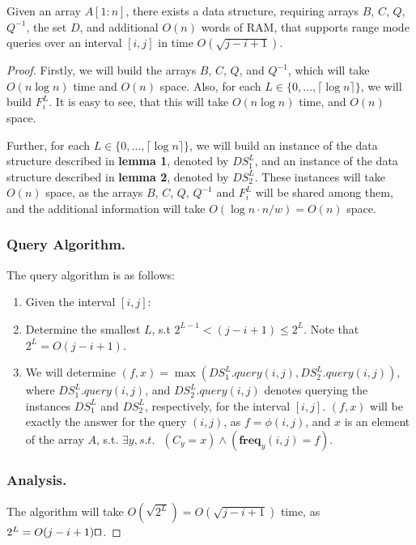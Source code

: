\documentclass[runningheads]{llncs}
\begin{document}
\begin{theorem} 
    Given an array $A[1:n]$, there exists a data structure, requiring arrays $B$, $C$, $Q$, $Q^{-1}$, the set $D$, and additional $O(n)$ words of RAM, that supports 
    range mode queries over an interval $[i,j]$ in time $O(\sqrt{j-i+1})$.
\end{theorem}
\begin{proof}
    Firstly, we will build the arrays $B$, $C$, $Q$, and $Q^{-1}$, which will take $O(n\log n)$ time and $O(n)$ space. 
    Also, for each $L\in \{0,\dots,\lceil \log n \rceil\}$, we will build $F^L_i$. It is easy to see, that this will take $O(n\log n)$ time, 
    and $O(n)$ space.

    Further, for each $L\in \{0,\dots,\lceil \log n \rceil\}$, we will build an instance of the data structure described in \textbf{lemma 1}, denoted by $DS_1^L$, and an instance of the data structure 
    described in \textbf{lemma 2}, denoted by $DS_2^L$. These instances will take $O(n)$ space, as the arrays $B$, $C$, $Q$, $Q^{-1}$ and $F^L_{i}$ will be shared among them, and the additional information 
    will take $O(\log n \cdot n/w) = O(n)$ space.

    \subsubsection{Query Algorithm.} The query algorithm is as follows:
        \begin{enumerate}
        
            \item[] Given the interval $[i,j]$:
            
            \item Determine the smallest $L$, s.t $2^{L-1}< (j-i+1) \leq 2^L$. Note that $2^L=O(j-i+1)$.
            
            \item We will determine $(f, x)=\max( DS_1^L.query(i,j) , DS_2^L.query(i,j) )$, where $DS_1^L.query(i,j)$, and $DS_2^L.query(i,j)$ denotes querying the instances $DS_1^L$ and $DS_2^L$, respectively, for the interval $[i,j]$.
             $(f,x)$ will be exactly the answer for the query $(i,j)$, as $f=\phi(i,j)$, and $x$ is an element of the array $A$, s.t. $\exists y, s.t.\text{ } (C_y=x) \land (\textbf{freq}_y(i,j)=f)$.

        
        \end{enumerate}

        \subsubsection{Analysis.}
        The algorithm will take $O(\sqrt{2^L})=O(\sqrt{j-i+1})$ time, as $2^L=O(j-i+1) \qed $. 


        

\end{proof}
\end{document}
